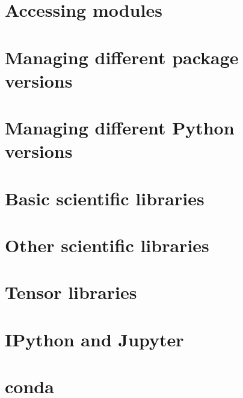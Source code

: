 \documentclass[oneside]{book}
\begin{document}
\part{Accessing modules}


\part{Managing different package versions}


\part{Managing different Python versions}


\part{Basic scientific libraries}





\part{Other scientific libraries}







\part{Tensor libraries}




\part{IPython and Jupyter}


\part{conda}

\end{document}
